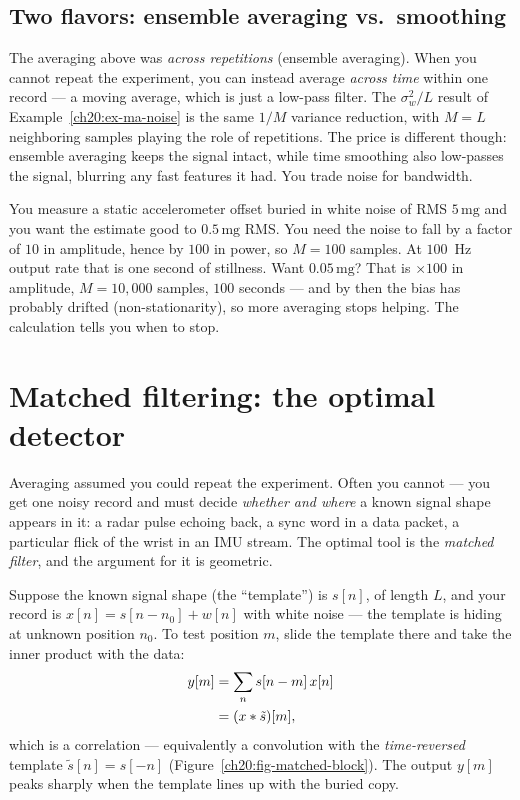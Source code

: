 \subsection{Two flavors: ensemble averaging vs.\ smoothing}

The averaging above was \emph{across repetitions} (ensemble averaging). When you
cannot repeat the experiment, you can instead average \emph{across time} within
one record --- a moving average, which is just a low-pass filter. The
$\sigma_w^2/L$ result of Example~\ref{ch20:ex-ma-noise} is the same $1/M$ variance
reduction, with $M=L$ neighboring samples playing the role of repetitions. The
price is different though: ensemble averaging keeps the signal intact, while time
smoothing also low-passes the signal, blurring any fast features it had. You
trade noise for bandwidth.

\begin{example}
\label{ch20:ex-howlong}
You measure a static accelerometer offset buried in white noise of RMS
$5\,\text{mg}$ and you want the estimate good to $0.5\,\text{mg}$ RMS. You need
the noise to fall by a factor of $10$ in amplitude, hence by $100$ in power, so
$M = 100$ samples. At $100$~Hz output rate that is one second of stillness.
Want $0.05\,\text{mg}$? That is $\times 100$ in amplitude, $M=10{,}000$ samples,
$100$ seconds --- and by then the bias has probably drifted (non-stationarity),
so more averaging stops helping. The calculation tells you when to stop.
\end{example}

\section{Matched filtering: the optimal detector}
\label{ch20:matched}

Averaging assumed you could repeat the experiment. Often you cannot --- you get
one noisy record and must decide \emph{whether and where} a known signal shape
appears in it: a radar pulse echoing back, a sync word in a data packet, a
particular flick of the wrist in an IMU stream. The optimal tool is the
\emph{matched filter}, and the argument for it is geometric.

Suppose the known signal shape (the ``template'') is $s[n]$, of length $L$, and
your record is $x[n]=s[n-n_0]+w[n]$ with white noise --- the template is hiding at
unknown position $n_0$. To test position $m$, slide the template there and take
the inner product with the data:
\begin{align}
  y[m] &= \sum_{n} s[n-m]\,x[n] \nonumber \\
  &= (x \ast \tilde s)[m],
  \label{ch20:matched-corr}
\end{align}
which is a correlation --- equivalently a convolution with the
\emph{time-reversed} template $\tilde s[n]=s[-n]$ (Figure~\ref{ch20:fig-matched-block}).
The output $y[m]$ peaks sharply when the template lines up with the buried copy.


